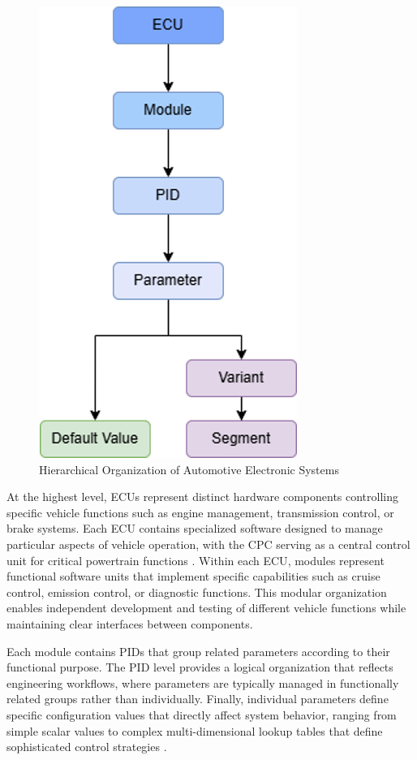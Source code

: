 \begin{figure}[ht]
    \centering
    \includegraphics[height=0.4\textheight]{figures/ecu_hierarchy.png}
    \caption{Hierarchical Organization of Automotive Electronic Systems}
    \label{fig:ecu-hierarchy}
\end{figure}

At the highest level, \acp{ECU} represent distinct hardware components controlling specific vehicle functions such as engine management, transmission control, or brake systems. Each \ac{ECU} contains specialized software designed to manage particular aspects of vehicle operation, with the \ac{CPC} serving as a central control unit for critical powertrain functions \cite{kiencke2000automotive}. Within each \ac{ECU}, modules represent functional software units that implement specific capabilities such as cruise control, emission control, or diagnostic functions. This modular organization enables independent development and testing of different vehicle functions while maintaining clear interfaces between components.

Each module contains \acp{PID} that group related parameters according to their functional purpose. The \ac{PID} level provides a logical organization that reflects engineering workflows, where parameters are typically managed in functionally related groups rather than individually. Finally, individual parameters define specific configuration values that directly affect system behavior, ranging from simple scalar values to complex multi-dimensional lookup tables that define sophisticated control strategies \cite{staron2021autosar}.

